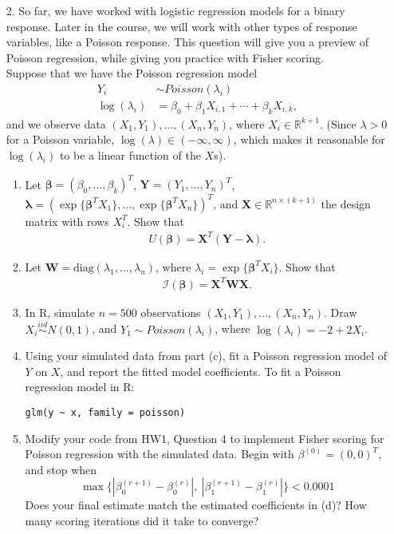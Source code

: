 \documentclass[11pt]{article}
\begin{document}
\begin{enumerate}
\item[2.] So far, we have worked with logistic regression models for a binary response. Later in the course, we will work with other types of response variables, like a Poisson response. This question will give you a preview of Poisson regression, while giving you practice with Fisher scoring. \\

Suppose that we have the Poisson regression model
\begin{align*}
Y_i &\sim Poisson(\lambda_i) \\
\log(\lambda_i) &= \beta_0 + \beta_1X_{i,1} + \cdots + \beta_k X_{i,k},
\end{align*}
and we observe data $(X_1, Y_1),...,(X_n, Y_n)$, where $X_i \in \mathbb{R}^{k+1}$. (Since $\lambda > 0$ for a Poisson variable, $\log(\lambda) \in (-\infty, \infty)$, which makes it reasonable for $\log(\lambda_i)$ to be a linear function of the $X$s).

\begin{enumerate}
\item Let $\bm{\beta} = (\beta_0,...,\beta_k)^T$, $\bm{Y} = (Y_1,...,Y_n)^T$, $\bm{\lambda} = (\exp\{ \bm{\beta}^T X_1 \}, ..., \exp\{ \bm{\beta}^T X_n \})^T$, and $\mathbf{X} \in \mathbb{R}^{n \times (k+1)}$ the design matrix with rows $X_i^T$. Show that
\begin{align*}
U(\bm{\beta}) = \mathbf{X}^T(\bm{Y} - \bm{\lambda}).
\end{align*}

\item Let $\bm{W} = \text{diag}(\lambda_1,...,\lambda_n)$, where $\lambda_i = \exp\{ \bm{\beta}^T X_i \}$. Show that
\begin{align*}
\mathcal{I}(\bm{\beta}) = \bm{X}^T \bm{W} \bm{X}.
\end{align*}

\item In R, simulate $n = 500$ observations $(X_1, Y_1),...,(X_n, Y_n)$. Draw $X_i \overset{iid}{\sim} N(0, 1)$, and $Y_1 \sim Poisson(\lambda_i)$, where $\log(\lambda_i) = -2 + 2 X_i$. 

\item Using your simulated data from part (c), fit a Poisson regression model of $Y$ on $X$, and report the fitted model coefficients. To fit a Poisson regression model in R: 

\begin{verbatim}
glm(y ~ x, family = poisson)
\end{verbatim}

\item Modify your code from HW1, Question 4 to implement Fisher scoring for Poisson regression with the simulated data. Begin with $\beta^{(0)} = (0, 0)^T$, and stop when
$$\max \{ |\beta_0^{(r+1)} - \beta_0^{(r)}|, \ |\beta_1^{(r+1)} - \beta_1^{(r)}| \} < 0.0001$$
Does your final estimate match the estimated coefficients in (d)? How many scoring iterations did it take to converge?
\end{enumerate}

\end{enumerate}
\end{document}
